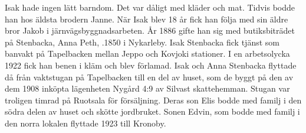 Isak hade ingen lätt barndom. Det var dåligt med kläder och mat. Tidvis bodde han hos äldsta brodern Janne. När Isak blev 18 år fick han följa med sin äldre bror Jakob i järnvägsbyggnadsarbeten. År 1886 gifte han sig med butiksbiträdet på Stenbacka, Anna Peth, .1850 i Nykarleby. Isak Stenbacka fick tjänst som banvakt på Tapelbacken mellan Jeppo och Kovjoki stationer. I en arbetsolycka 1922 fick han benen i kläm och blev förlamad. Isak och Anna Stenbacka flyttade då från vaktstugan på Tapelbacken till en del av huset, som de byggt på den av dem 1908 inköpta lägenheten Nygård 4:9 av Silvast skattehemman. Stugan var troligen timrad på Ruotsala för försäljning. Deras son Elis bodde med familj i den södra delen av huset och skötte jordbruket. Sonen Edvin, som bodde med familj i den norra lokalen flyttade 1923 till Kronoby.

